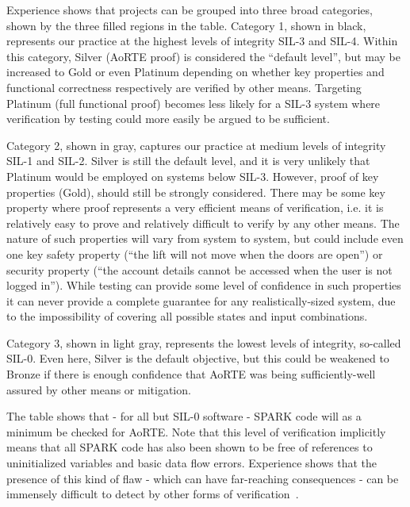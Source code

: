 \documentclass{llncs}
\begin{document}
Experience shows that projects can be grouped into three broad categories, shown by the three
filled regions in the table. Category 1, shown in black, represents our
practice at the highest levels of integrity SIL-3 and SIL-4. Within this
category, Silver (AoRTE proof) is considered the ``default level'', but may be
increased to Gold or even Platinum depending on whether key properties and
functional correctness respectively are verified by other means. Targeting
Platinum (full functional proof) becomes less likely for a SIL-3 system where
verification by testing could more easily be argued to be sufficient.

Category 2, shown in gray, captures our practice at medium levels of integrity
SIL-1 and SIL-2. Silver is still the default level, and it is very unlikely
that Platinum would be employed on systems below SIL-3.  However, proof of key
properties (Gold), should still be strongly considered. There may be some key
property where proof represents a very efficient means of verification, i.e. it
is relatively easy to prove and relatively difficult to verify by any other
means. The nature of such properties will vary from system to system, but could
include even one key safety property (``the lift will not move when the doors
are open'') or security property (``the account details cannot be accessed when
the user is not logged in''). While testing can provide some level of
confidence in such properties it can never provide a complete guarantee for any
realistically-sized system, due to the impossibility of covering all possible
states and input combinations.

Category 3, shown in light gray, represents the lowest levels of integrity,
so-called SIL-0. Even here, Silver is the default objective,
but this could be weakened to Bronze if there is enough confidence
that AoRTE was being sufficiently-well assured by other means or mitigation.

The table shows that - for all but SIL-0 software - SPARK code will as a
minimum be checked for AoRTE. Note that this level of verification implicitly
means that all SPARK code has also been shown to be free of references to
uninitialized variables and basic data flow errors.  Experience shows that the
presence of this kind of flaw - which can have far-reaching consequences - can
be immensely difficult to detect by other forms of
verification~\cite{King2000TSE}.
\end{document}
